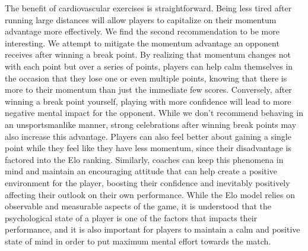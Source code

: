 \documentclass[letterpaper, 12pt]{article}
\begin{document}
        The benefit of cardiovascular exercises is straightforward. Being less tired after running large distances will allow players to capitalize on their momentum advantage more effectively. We find the second recommendation to be more interesting. We attempt to mitigate the momentum advantage an opponent receives after winning a break point. By realizing that momentum changes not with each point but over a series of points, players can help calm themselves in the occasion that they lose one or even multiple points, knowing that there is more to their momentum than just the immediate few scores. Conversely, after winning a break point yourself, playing with more confidence will lead to more negative mental impact for the opponent. While we don't recommend behaving in an unsportsmanlike manner, strong celebrations after winning break points may also increase this advantage. Players can also feel better about gaining a single point while they feel like they have less momentum, since their disadvantage is factored into the Elo ranking. Similarly, coaches can keep this phenomena in mind and maintain an encouraging attitude that can help create a positive environment for the player, boosting their confidence and inevitably positively affecting their outlook on their own performance. While the Elo model relies on observable and measurable aspects of the game, it is understood that the psychological state of a player is one of the factors that impacts their performance, and it is also important for players to maintain a calm and positive state of mind in order to put maximum mental effort towards the match. 
    
    \printbibliography
\end{document}
